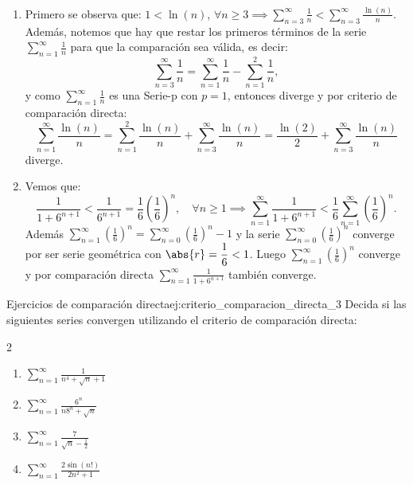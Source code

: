 \begin{soln}
    $\left. \right.$
    \begin{enumerate}
        \item Primero se observa que: $1 < \ln(n)$, $\forall n \ge 3 \implies \displaystyle \sum_{n=3}^{\infty}\frac{1}{n} < \displaystyle \sum_{n=3}^{\infty}\frac{\ln(n)}{n}$. Además, notemos que hay que restar los primeros términos de la serie $\displaystyle \sum_{n=1}^{\infty}\frac{1}{n}$ para que la comparación sea válida, es decir:
        \[ \sum_{n=3}^{\infty}\frac{1}{n} = \sum_{n=1}^{\infty}\frac{1}{n} - \sum_{n=1}^{2}\frac{1}{n}, \]
        y como $\displaystyle \sum_{n=1}^{\infty}\frac{1}{n}$ es una Serie-p con $p=1$, entonces diverge y por criterio de comparación directa:
        \[ \sum_{n=1}^{\infty}\frac{\ln(n)}{n} = \sum_{n=1}^{2}\frac{\ln(n)}{n} + \sum_{n=3}^{\infty}\frac{\ln(n)}{n} = \frac{\ln(2)}{2} + \sum_{n=3}^{\infty}\frac{\ln(n)}{n} \]
        diverge.
        
        \item Vemos que:
        \[ \frac{1}{1+6^{n+1}} < \frac{1}{6^{n+1}} = \frac{1}{6}\left(\frac{1}{6}\right)^{n}, \quad \forall n \ge 1 \implies \sum_{n=1}^{\infty}\frac{1}{1+6^{n+1}} < \frac{1}{6}\sum_{n=1}^{\infty}\left(\frac{1}{6}\right)^{n}. \]
        Además $\displaystyle \sum_{n=1}^{\infty}\left(\frac{1}{6}\right)^{n} = \displaystyle \sum_{n=0}^{\infty}\left(\frac{1}{6}\right)^{n} - 1$ y la serie $\displaystyle \sum_{n=0}^{\infty}\left(\frac{1}{6}\right)^{n}$ converge por ser serie geométrica con $\abs{r}=\dfrac{1}{6}<1$. Luego $\displaystyle \sum_{n=1}^{\infty}\left(\frac{1}{6}\right)^{n}$ converge y por comparación directa $\displaystyle \sum_{n=1}^{\infty}\frac{1}{1+6^{n+1}}$ también converge.
    \end{enumerate}
\end{soln}

\begin{problem}{Ejercicios de comparación directa}{ej:criterio_comparacion_directa_3}
    Decida si las siguientes series convergen utilizando el criterio de comparación directa:
    \begin{multicols}{2}
        \begin{enumerate}
            \item $\displaystyle\sum_{n=1}^{\infty}\frac{1}{n^{4}+\sqrt{n}+1}$
            \item $\displaystyle\sum_{n=1}^{\infty}\frac{6^{n}}{n8^{n}+\sqrt{n}}$
            \item $\displaystyle\sum_{n=1}^{\infty}\frac{7}{\sqrt{n}-\frac{1}{2}}$
            \item $\displaystyle\sum_{n=1}^{\infty}\frac{2\sin(n!)}{2n^{2}+1}$
        \end{enumerate}
    \end{multicols}
\end{problem}

